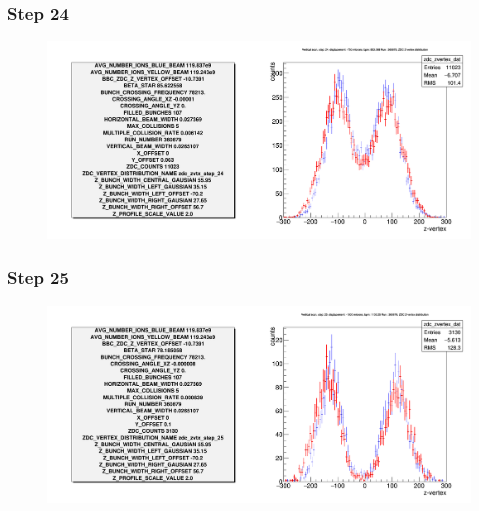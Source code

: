 \begin{frame}
  \frametitle{Step 24}
  \begin{figure}
    \includegraphics[width=\linewidth]{"./figures/tuned_simulation_step_24"}
    \caption{}
    \label{fig:step_24}
  \end{figure}
\end{frame}

\begin{frame}
  \frametitle{Step 25}
  \begin{figure}
    \includegraphics[width=\linewidth]{"./figures/tuned_simulation_step_25"}
    \caption{}
    \label{fig:step_25}
  \end{figure}
\end{frame}

